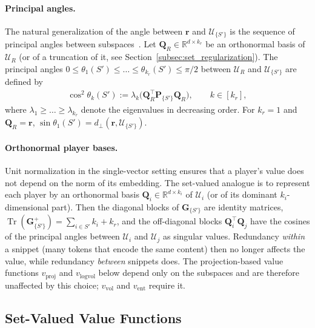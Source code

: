 \documentclass{article}
\begin{document}
\paragraph{Principal angles.}
The natural generalization of the angle between $\mathbf{r}$ and $\mathcal{U}_{\{S'\}}$ is the sequence of principal angles between subspaces~\cite{bjorck1973numerical}. Let $\mathbf{Q}_R \in \mathbb{R}^{d \times k_r}$ be an orthonormal basis of $\mathcal{U}_R$ (or of a truncation of it, see Section~\ref{subsec:set_regularization}). The principal angles $0 \le \theta_1(S') \le \dots \le \theta_{k_r}(S') \le \pi/2$ between $\mathcal{U}_R$ and $\mathcal{U}_{\{S'\}}$ are defined by
\begin{align}\label{eq:principal_angles}
    \cos^2 \theta_k(S') := \lambda_k\big(\mathbf{Q}_R^\top \mathbf{P}_{\{S'\}} \mathbf{Q}_R\big), \qquad k \in [k_r],
\end{align}
where $\lambda_1 \ge \dots \ge \lambda_{k_r}$ denote the eigenvalues in decreasing order. For $k_r = 1$ and $\mathbf{Q}_R = \mathbf{r}$, $\sin \theta_1(S') = d_{\perp}(\mathbf{r}, \mathcal{U}_{\{S'\}})$.

\paragraph{Orthonormal player bases.}
Unit normalization in the single-vector setting ensures that a player's value does not depend on the norm of its embedding. The set-valued analogue is to represent each player by an orthonormal basis $\mathbf{Q}_i \in \mathbb{R}^{d \times k_i}$ of $\mathcal{U}_i$ (or of its dominant $k_i$-dimensional part). Then the diagonal blocks of $\mathbf{G}_{\{S'\}}$ are identity matrices, $\operatorname{Tr}(\mathbf{G}^{+}_{\{S'\}}) = \sum_{i \in S'} k_i + k_r$, and the off-diagonal blocks $\mathbf{Q}_i^\top \mathbf{Q}_j$ have the cosines of the principal angles between $\mathcal{U}_i$ and $\mathcal{U}_j$ as singular values. Redundancy \emph{within} a snippet (many tokens that encode the same content) then no longer affects the value, while redundancy \emph{between} snippets does. The projection-based value functions $v_{\text{proj}}$ and $v_{\text{logvol}}$ below depend only on the subspaces and are therefore unaffected by this choice; $v_{\text{vol}}$ and $v_{\text{ent}}$ require it.

\subsection{Set-Valued Value Functions}
\label{subsec:set_values}
\end{document}
